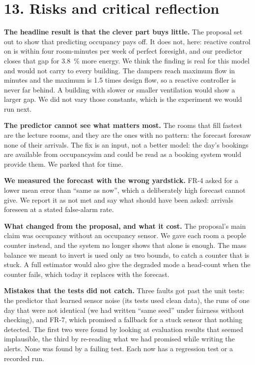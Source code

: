\section{13. Risks and critical reflection}

\textbf{The headline result is that the clever part buys little.} The proposal
set out to show that predicting occupancy pays off. It does not, here: reactive
control on \COtwo{} is within four room-minutes per week of perfect foresight,
and our predictor closes that gap for 3.8~\% more energy. We think the finding
is real for this model and would not carry to every building. The dampers reach
maximum flow in minutes and the maximum is 1.5 times design flow, so a
reactive controller is never far behind. A building with slower or smaller
ventilation would show a larger gap. We did not vary those constants, which is
the experiment we would run next.

\textbf{The predictor cannot see what matters most.} The rooms that fill
fastest are the lecture rooms, and they are the ones with no pattern: the
forecast foresaw none of their arrivals. The fix is an input, not a better
model: the day's bookings are available from occupancysim and could be read as
a booking system would provide them. We parked that for time.

\textbf{We measured the forecast with the wrong yardstick.} FR-4 asked for a
lower mean error than ``same as now'', which a deliberately high forecast
cannot give. We report it as not met and say what should have been asked:
arrivals foreseen at a stated false-alarm rate.

\textbf{What changed from the proposal, and what it cost.} The proposal's main
claim was occupancy without an occupancy sensor. We gave each room a people
counter instead, and the system no longer shows that \COtwo{} alone is enough.
The mass balance we meant to invert is used only as two bounds, to catch a
counter that is stuck. A full estimator would also give the degraded mode a
head-count when the counter fails, which today it replaces with the forecast.

\textbf{Mistakes that the tests did not catch.} Three faults got past the
unit tests: the predictor that learned sensor noise (its tests used clean
data), the runs of one day that were not identical (we had written ``same
seed'' under fairness without checking), and FR-7, which promised a fallback
for a stuck sensor that nothing detected. The first two were found by looking
at evaluation results that seemed implausible, the third by re-reading what we
had promised while writing the alerts. None was found by a failing test. Each
now has a regression test or a recorded run.

